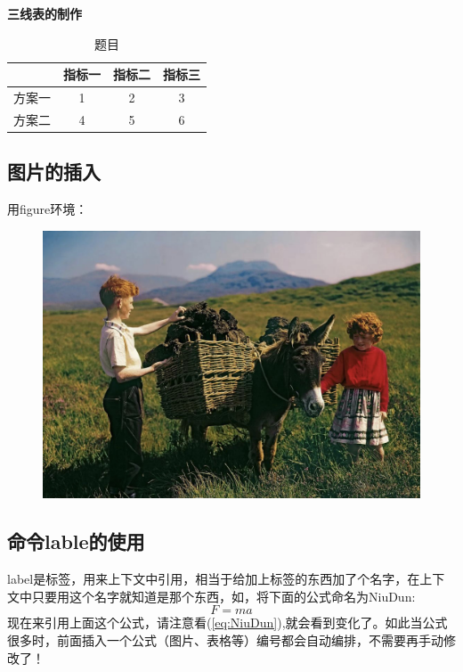 \documentclass[UTF8]{ctexart}
\begin{document}
    \textbf{三线表的制作}
    \begin{table}[!htbp] %
    	\centering
    	\caption{题目}
    	\begin{tabular}{cccc}
    		\toprule
    		&指标一&指标二&指标三\\
    		\midrule
    		方案一&1&2&3 \\
    		方案二&4&5&6 \\
    		\bottomrule
    	\end{tabular}
     \end{table}
 
 	\subsection{图片的插入}
 	用figure环境：
 	
 	\begin{figure}[hptb]
 		\centering
 		\includegraphics[width=0.7\linewidth]{name}
 		\caption{}
 		\label{fig:name}
 	\end{figure}
 
 	\subsection{命令lable的使用}
 	label是标签，用来上下文中引用，相当于给加上标签的东西加了个名字，在上下文中只要用这个名字就知道是那个东西，如，将下面的公式命名为NiuDun:
 	\begin{equation}
 		F=ma \label{eq:NiuDun}
 	\end{equation}
 	现在来引用上面这个公式，请注意看(\ref{eq:NiuDun}),就会看到变化了。如此当公式很多时，前面插入一个公式（图片、表格等）编号都会自动编排，不需要再手动修改了！
 	
\end{document}
